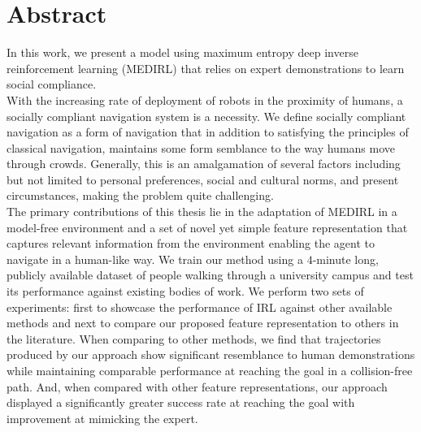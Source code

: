 \chapter*{\rm\bfseries Abstract}
In this work, we present a model using maximum entropy deep inverse reinforcement learning (MEDIRL) that relies on expert demonstrations to learn social compliance.\\
With the increasing rate of deployment of robots in the proximity of humans, a socially compliant navigation system is a necessity. We define socially compliant navigation as a form of navigation that in addition to satisfying the principles of classical navigation, maintains some form semblance to the way humans move through crowds. Generally, this is an amalgamation of several factors including but not limited to personal preferences, social and cultural norms, and present circumstances, making the problem quite challenging.\\
 The primary contributions of this thesis lie in the adaptation of MEDIRL in a model-free environment and a set of novel yet simple feature representation that captures relevant information from the environment enabling the agent to navigate in a human-like way. We train our method using a $4$-minute long, publicly available dataset of people walking through a university campus and test its performance against existing bodies of work. We perform two sets of experiments: first to showcase the performance of IRL against other available methods and next to compare our proposed feature representation to others in the literature. When comparing to other methods, we find that trajectories produced by our approach show significant resemblance to human demonstrations while maintaining comparable performance at reaching the goal in a collision-free path. And, when compared with other feature representations, our approach displayed a significantly greater success rate at reaching the goal with improvement at mimicking the expert.\\



